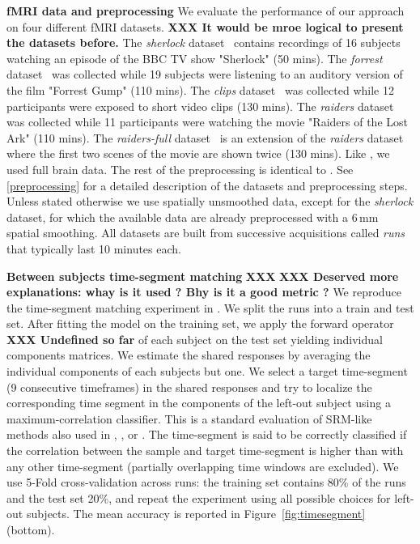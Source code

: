 \textbf{fMRI data and preprocessing} 
We evaluate the performance of our approach on four different fMRI datasets.
%
\textbf{XXX It would be mroe logical to present the datasets before.}
The \emph{sherlock} dataset~\cite{chen2017shared} contains recordings of 16 subjects watching an episode of the BBC TV show "Sherlock" (50 mins).
%
The \emph{forrest} dataset~\cite{hanke2014high} was collected while 19 subjects were listening to an auditory version of the film "Forrest Gump" (110 mins).
%
The \emph{clips} dataset~\cite{ibc} was collected while 12 participants were exposed to short video clips (130 mins).
%
The \emph{raiders} dataset~\cite{ibc} was collected while 11 participants were watching the movie "Raiders of the Lost Ark" (110 mins).
%
The \emph{raiders-full} dataset~\cite{ibc} is an extension of the \emph{raiders} dataset where the first two scenes of the movie are shown twice (130 mins).
%
Like \cite{zhang2016searchlight}, we used full brain data. The rest of the preprocessing is identical to \cite{chen2017shared}. See \ref{preprocessing} for a detailed description of the datasets and preprocessing steps. Unless stated otherwise we use spatially unsmoothed data, except for the \emph{sherlock} dataset, for which the available data are already preprocessed with a 6\,mm spatial smoothing. All datasets are built from successive acquisitions called \emph{runs} that typically last 10 minutes each.
%

\textbf{Between subjects time-segment matching} \textbf{XXX}
\label{timesegment_expe}
%
\textbf{XXX Deserved more explanations: whay is it used ? Bhy is it a good metric ?}
We reproduce the time-segment matching experiment in
\cite{chen2015reduced}. 
We split the runs into a train and test set. After fitting the model on the training set, we apply the forward operator \textbf{XXX Undefined so far} of each subject on the test set yielding individual components matrices. We estimate the shared responses by averaging the individual components of each subjects but one.  We select a target time-segment (9 consecutive timeframes) in the shared responses and try to localize the corresponding time segment in the components of the left-out subject using a maximum-correlation classifier.
This is a standard evaluation of SRM-like methods also used in  \cite{chen2015reduced}, \cite{guntupalli2018computational}, \cite{Nastase741975} or
\cite{zhang2016searchlight}.
%
The time-segment is said to be
correctly classified if the correlation between the sample and target
time-segment is higher than with any other time-segment (partially overlapping time windows are excluded).
%
We use 5-Fold cross-validation across runs: the training set contains 80\% of the runs and the test set 20\%, and repeat the experiment using all possible choices for left-out subjects. 
%
The mean accuracy is reported in Figure~\ref{fig:timesegment} (bottom). 
%

